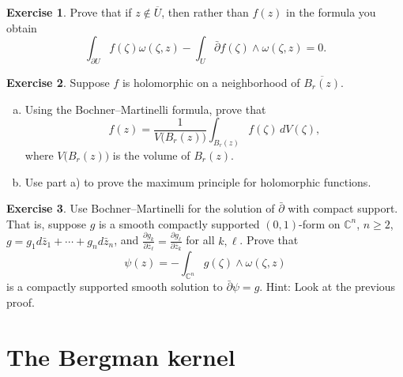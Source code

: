 \documentclass[12pt,openany]{book}
\newcommand{\C}{{\mathbb{C}}}
\theoremstyle{plain}
\theoremstyle{remark}
\theoremstyle{definition}
\newenvironment{exbox}{%
    \def\FrameCommand{\vrule width 1pt \relax\hspace {10pt}}%
    \MakeFramed {\advance \hsize -\width \FrameRestore }%
}{%
    \endMakeFramed
}
\newenvironment{exparts}{%
    \leavevmode\begin{enumerate}[a),noitemsep,topsep=0pt,parsep=0pt,partopsep=0pt]
}{%
    \end{enumerate}
}
\theoremstyle{exercise}
\newtheorem{exercise}{Exercise}[section]
\theoremstyle{example}
\begin{document}
\begin{exbox}
\begin{exercise}
Prove that if $z \notin \overline{U}$, then rather than $f(z)$ in the
formula you obtain
\begin{equation*}
\int_{\partial U}
f(\zeta) \omega(\zeta,z)
-
\int_{U}
\bar{\partial} f(\zeta) \wedge \omega(\zeta,z) = 0 .
\end{equation*}
\end{exercise}

\begin{exercise}
Suppose $f$ is holomorphic on a neighborhood of
$\overline{B_r(z)}$.
\begin{exparts}
\item
Using the Bochner--Martinelli formula, prove that
\begin{equation*}
f(z) = \frac{1}{V\bigl(B_r(z)\bigr)} \int_{B_r(z)} f(\zeta) \, dV(\zeta) ,
\end{equation*}
where $V\bigl(B_r(z)\bigr)$ is the volume of $B_r(z)$.
\item
Use part a) to prove the maximum principle for holomorphic functions.
\end{exparts}
\end{exercise}

\begin{exercise}
Use Bochner--Martinelli for the solution of $\bar{\partial}$ with compact
support.  That is, suppose $g$ is a smooth compactly supported $(0,1)$-form
on $\C^n$, $n \geq 2$, $g = g_1 d\bar{z}_1 + \cdots + g_n d\bar{z}_n$,
and
$\frac{\partial g_k}{\partial \bar{z}_\ell} =
\frac{\partial g_\ell}{\partial \bar{z}_k}$ for all $k, \ell$.
Prove that
\begin{equation*}
\psi(z) = - \int_{\C^n} g(\zeta) \wedge \omega(\zeta,z)
\end{equation*}
is a compactly supported smooth solution to $\bar{\partial} \psi = g$.
Hint: Look at the previous proof.
\end{exercise}
\end{exbox}


\section{The Bergman kernel}
\end{document}
